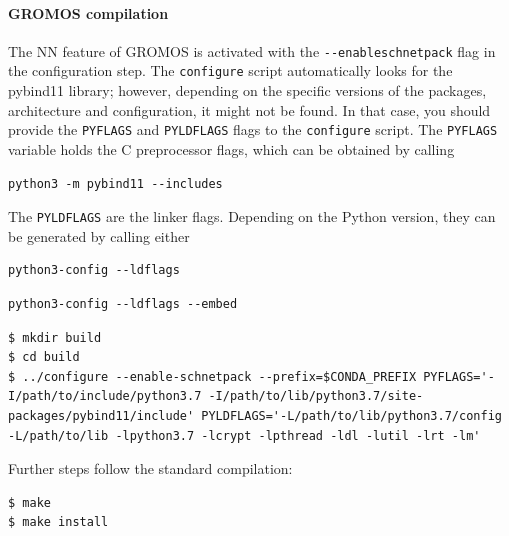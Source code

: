 \paragraph{GROMOS compilation}
The NN feature of GROMOS is activated with the \texttt{-{}-enable\-schnetpack} flag in the configuration step. The \texttt{configure} script automatically looks for the pybind11 library; however, depending on the specific versions of the packages, architecture and configuration, it might not be found. In that case, you should provide the \texttt{PYFLAGS} and \texttt{PYLDFLAGS} flags to the \texttt{configure} script. The \texttt{PYFLAGS} variable holds the C preprocessor flags, which can be obtained by calling

\begin{lstlisting}[breaklines=true, breakatwhitespace=false]
python3 -m pybind11 --includes
\end{lstlisting}

The \texttt{PYLDFLAGS} are the linker flags. Depending on the Python version, they can be generated by calling either 

\begin{lstlisting}[breaklines=true, breakatwhitespace=false]
python3-config --ldflags
\end{lstlisting}


\begin{lstlisting}[breaklines=true, breakatwhitespace=false]
python3-config --ldflags --embed
\end{lstlisting}

\begin{lstlisting}[breaklines=true, breakatwhitespace=false, showstringspaces=false]
$ mkdir build
$ cd build
$ ../configure --enable-schnetpack --prefix=$CONDA_PREFIX PYFLAGS='-I/path/to/include/python3.7 -I/path/to/lib/python3.7/site-packages/pybind11/include' PYLDFLAGS='-L/path/to/lib/python3.7/config -L/path/to/lib -lpython3.7 -lcrypt -lpthread -ldl -lutil -lrt -lm'
\end{lstlisting}

Further steps follow the standard compilation:
\begin{lstlisting}[breaklines=true, breakatwhitespace=false]
$ make
$ make install
\end{lstlisting}


